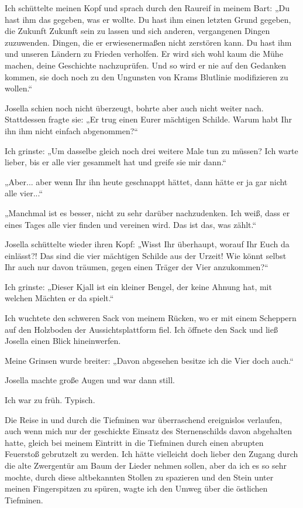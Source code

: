 Ich schüttelte meinen Kopf und sprach durch den Raureif in meinem Bart: „Du hast ihm das gegeben, was er wollte. Du hast ihm einen letzten Grund gegeben, die Zukunft Zukunft sein zu lassen und sich anderen, vergangenen Dingen zuzuwenden. Dingen, die er erwiesenermaßen nicht zerstören kann. Du hast ihm und unseren Ländern zu Frieden verholfen. Er wird sich wohl kaum die Mühe machen, deine Geschichte nachzuprüfen. Und so wird er nie auf den Gedanken kommen, sie doch noch zu den Ungunsten von Krams Blutlinie modifizieren zu wollen.“

Josella schien noch nicht überzeugt, bohrte aber auch nicht weiter nach. Stattdessen fragte sie: „Er trug einen Eurer mächtigen Schilde. Warum habt Ihr ihn ihm nicht einfach abgenommen?“

Ich grinste: „Um dasselbe gleich noch drei weitere Male tun zu müssen? Ich warte lieber, bis er alle vier gesammelt hat und greife sie mir dann.“

„Aber... aber wenn Ihr ihn heute geschnappt hättet, dann hätte er ja gar nicht alle vier...“

„Manchmal ist es besser, nicht zu sehr darüber nachzudenken. Ich weiß, dass er eines Tages alle vier finden und vereinen wird. Das ist das, was zählt.“

Josella schüttelte wieder ihren Kopf: „Wisst Ihr überhaupt, worauf Ihr Euch da einlässt?! Das sind die vier mächtigen Schilde aus der Urzeit! Wie könnt selbst Ihr auch nur davon träumen, gegen einen Träger der Vier anzukommen?“

Ich grinste: „Dieser Kjall ist ein kleiner Bengel, der keine Ahnung hat, mit welchen Mächten er da spielt.“

Ich wuchtete den schweren Sack von meinem Rücken, wo er mit einem Scheppern auf den Holzboden der Aussichtsplattform fiel. Ich öffnete den Sack und ließ Josella einen Blick hineinwerfen.

Meine Grinsen wurde breiter: „Davon abgesehen besitze ich die Vier doch auch.“

Josella machte große Augen und war dann still.\bigskip





Ich war zu früh. Typisch.

Die Reise in und durch die Tiefminen war überraschend ereignislos verlaufen, auch wenn mich nur der geschickte Einsatz des Sternenschilds davon abgehalten hatte, gleich bei meinem Eintritt in die Tiefminen durch einen abrupten Feuerstoß gebrutzelt zu werden. Ich hätte vielleicht doch lieber den Zugang durch die alte Zwergentür am Baum der Lieder nehmen sollen, aber da ich es so sehr mochte, durch diese altbekannten Stollen zu spazieren und den Stein unter meinen Fingerspitzen zu spüren, wagte ich den Umweg über die östlichen Tiefminen.

